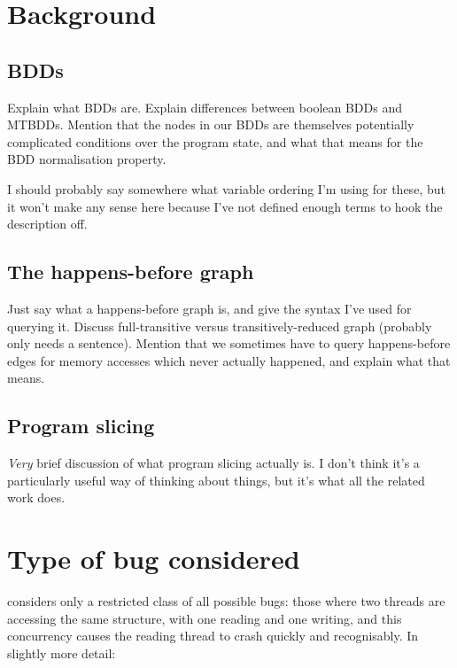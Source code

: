 \section{Background}
\subsection{BDDs}

Explain what BDDs are.  Explain differences between boolean BDDs and
MTBDDs.  Mention that the nodes in our BDDs are themselves potentially
complicated conditions over the program state, and what that means for
the BDD normalisation property.

I should probably say somewhere what variable ordering I'm using for
these, but it won't make any sense here because I've not defined
enough terms to hook the description off.

\subsection{The happens-before graph}

Just say what a happens-before graph is, and give the syntax I've used
for querying it.  Discuss full-transitive versus transitively-reduced
graph (probably only needs a sentence).  Mention that we sometimes
have to query happens-before edges for memory accesses which never
actually happened, and explain what that means.

\subsection{Program slicing}

\emph{Very} brief discussion of what program slicing actually is.  I
don't think it's a particularly useful way of thinking about things,
but it's what all the related work does.

\section{Type of bug considered}
\label{sect:intro:types_of_bugs}

{\Technique} considers only a restricted class of all possible bugs:
those where two threads are accessing the same structure, with one
reading and one writing, and this concurrency causes the reading
thread to crash quickly and recognisably.  In slightly more detail:

